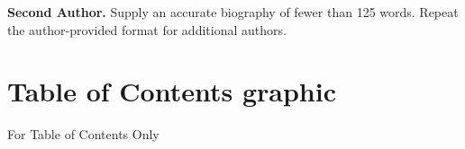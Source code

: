 \documentclass[letterpaper,12pt]{article}
\begin{document}
\noindent\textbf{Second Author.} Supply an accurate biography of fewer
than 125 words. Repeat the author-provided format for additional authors.



\clearpage
\section*{Table of Contents graphic}
\noindent For Table of Contents Only
\begin{center}
\end{center}
\end{document}
